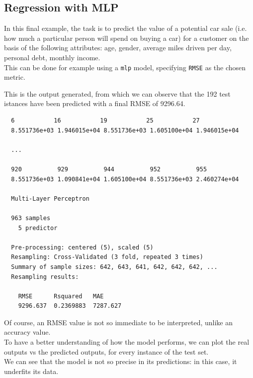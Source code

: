 \documentclass{article}
\begin{document}
\pagebreak

\subsection{Regression with MLP}
In this final example, the task is to predict the value of a potential car sale (i.e. how much a particular person will spend on buying a car) for a customer on the basis of the following attributes: age, gender, average miles driven per day, personal debt, monthly income.\\

This can be done for example using a \texttt{mlp} model, specifying \texttt{RMSE} as the chosen metric.\\



\pagebreak

This is the output generated, from which we can observe that the 192 test istances have been predicted with a final RMSE of 9296.64.\\

\begin{lstlisting}
  6           16           19           25           27           
  8.551736e+03 1.946015e+04 8.551736e+03 1.605100e+04 1.946015e+04 

  ...

  920          929          944          952          955 
  8.551736e+03 1.090841e+04 1.605100e+04 8.551736e+03 2.460274e+04 

  Multi-Layer Perceptron 
  
  963 samples
    5 predictor
  
  Pre-processing: centered (5), scaled (5) 
  Resampling: Cross-Validated (3 fold, repeated 3 times) 
  Summary of sample sizes: 642, 643, 641, 642, 642, 642, ... 
  Resampling results:
  
    RMSE      Rsquared   MAE     
    9296.637  0.2369883  7287.627
\end{lstlisting}

\pagebreak

Of course, an RMSE value is not so immediate to be interpreted, unlike an accuracy value.\\
To have a better understanding of how the model performs, we can plot the real outputs vs the predicted outputs, for every instance of the test set.\\

We can see that the model is not so precise in its predictions: in this case, it underfits its data.\\
\end{document}
